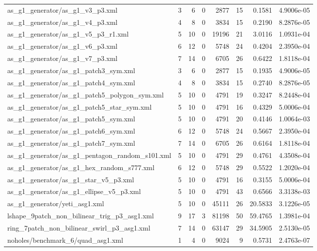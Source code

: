 \documentclass[11pt,a4paper]{article}
\begin{document}
\begin{longtable}{>{\ttfamily\scriptsize\raggedright\arraybackslash}p{8.4cm}rrrrrrr}
as\_g1\_generator/as\_g1\_v3\_p3.xml & 3 & 6 & 0 & 2877 & 15 & 0.1581 & 4.9006e-05 \\
as\_g1\_generator/as\_g1\_v4\_p3.xml & 4 & 8 & 0 & 3834 & 15 & 0.2190 & 8.2876e-05 \\
as\_g1\_generator/as\_g1\_v5\_p3\_r1.xml & 5 & 10 & 0 & 19196 & 21 & 3.0116 & 1.0931e-04 \\
as\_g1\_generator/as\_g1\_v6\_p3.xml & 6 & 12 & 0 & 5748 & 24 & 0.4204 & 2.3950e-04 \\
as\_g1\_generator/as\_g1\_v7\_p3.xml & 7 & 14 & 0 & 6705 & 26 & 0.6422 & 1.8118e-04 \\
as\_g1\_generator/as\_g1\_patch3\_sym.xml & 3 & 6 & 0 & 2877 & 15 & 0.1935 & 4.9006e-05 \\
as\_g1\_generator/as\_g1\_patch4\_sym.xml & 4 & 8 & 0 & 3834 & 15 & 0.2740 & 8.2876e-05 \\
as\_g1\_generator/as\_g1\_patch5\_polygon\_sym.xml & 5 & 10 & 0 & 4791 & 19 & 0.3247 & 8.2448e-04 \\
as\_g1\_generator/as\_g1\_patch5\_star\_sym.xml & 5 & 10 & 0 & 4791 & 16 & 0.4329 & 5.0006e-04 \\
as\_g1\_generator/as\_g1\_patch5\_sym.xml & 5 & 10 & 0 & 4791 & 20 & 0.4146 & 1.0064e-03 \\
as\_g1\_generator/as\_g1\_patch6\_sym.xml & 6 & 12 & 0 & 5748 & 24 & 0.5667 & 2.3950e-04 \\
as\_g1\_generator/as\_g1\_patch7\_sym.xml & 7 & 14 & 0 & 6705 & 26 & 0.6164 & 1.8118e-04 \\
as\_g1\_generator/as\_g1\_pentagon\_random\_s101.xml & 5 & 10 & 0 & 4791 & 29 & 0.4761 & 4.3508e-04 \\
as\_g1\_generator/as\_g1\_hex\_random\_s777.xml & 6 & 12 & 0 & 5748 & 29 & 0.5522 & 1.2020e-04 \\
as\_g1\_generator/as\_g1\_star\_v5\_p3.xml & 5 & 10 & 0 & 4791 & 16 & 0.3155 & 5.0006e-04 \\
as\_g1\_generator/as\_g1\_ellipse\_v5\_p3.xml & 5 & 10 & 0 & 4791 & 43 & 0.6566 & 3.3138e-03 \\
as\_g1\_generator/yeti\_asg1.xml & 5 & 10 & 0 & 45111 & 26 & 20.5833 & 3.1226e-05 \\
lshape\_9patch\_non\_bilinear\_trig\_p3\_asg1.xml & 9 & 17 & 3 & 81198 & 50 & 59.4765 & 1.3981e-04 \\
ring\_7patch\_non\_bilinear\_swirl\_p3\_asg1.xml & 7 & 14 & 0 & 63147 & 29 & 34.5905 & 2.5130e-05 \\
noholes/benchmark\_6/quad\_asg1.xml & 1 & 4 & 0 & 9024 & 9 & 0.5731 & 2.4763e-07 \\

\end{longtable}
\end{document}
